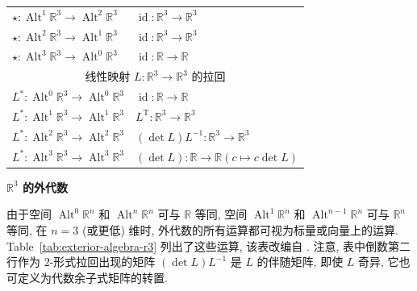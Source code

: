 \begin{table}[htbp]
\begin{tabular}{l|l}
$\star:\operatorname{Alt}^1\mathbb R^3\to\operatorname{Alt}^2\mathbb R^3$&$\operatorname{id}:\mathbb R^3\to\mathbb R^3$\\
$\star:\operatorname{Alt}^2\mathbb R^3\to\operatorname{Alt}^1\mathbb R^3$&$\operatorname{id}:\mathbb R^3\to\mathbb R^3$\\
$\star:\operatorname{Alt}^3\mathbb R^3\to\operatorname{Alt}^0\mathbb R^3$&$\operatorname{id}:\mathbb R\to\mathbb R$\\\hline
\multicolumn{2}{c}{{线性映射 $L:\mathbb R^3\to\mathbb R^3$ 的拉回}}\\\hline
$L^*:\operatorname{Alt}^0\mathbb R^3\to\operatorname{Alt}^0\mathbb R^3$&$\operatorname{id}:\mathbb R\to\mathbb R$\\
$L^*:\operatorname{Alt}^1\mathbb R^3\to\operatorname{Alt}^1\mathbb R^3$&$L^{\mathrm T}:\mathbb R^3\to\mathbb R^3$\\
$L^*:\operatorname{Alt}^2\mathbb R^3\to\operatorname{Alt}^2\mathbb R^3$&$(\det L)L^{-1}:\mathbb R^3\to\mathbb R^3$\\
$L^*:\operatorname{Alt}^3\mathbb R^3\to\operatorname{Alt}^3\mathbb R^3$&$(\det L):\mathbb R\to\mathbb R$\quad$(c\mapsto c\det L)$\\\hline
\end{tabular}
\end{table}

\medskip\noindent\textbf{{$\mathbb R^3$ 的外代数}}\par
{由于空间 $\operatorname{Alt}^0\mathbb R^n$ 和 $\operatorname{Alt}^n\mathbb R^n$ 可与 $\mathbb R$ 等同, 空间 $\operatorname{Alt}^1\mathbb R^n$ 和 $\operatorname{Alt}^{n-1}\mathbb R^n$ 可与 $\mathbb R^n$ 等同, 在 $n=3$ (或更低) 维时, 外代数的所有运算都可视为标量或向量上的运算. Table~\ref{tab:exterior-algebra-r3} 列出了这些运算, 该表改编自 . 注意, 表中倒数第二行作为 $2$-形式拉回出现的矩阵 $(\det L)L^{-1}$ 是 $L$ 的伴随矩阵, 即使 $L$ 奇异, 它也可定义为代数余子式矩阵的转置.}
